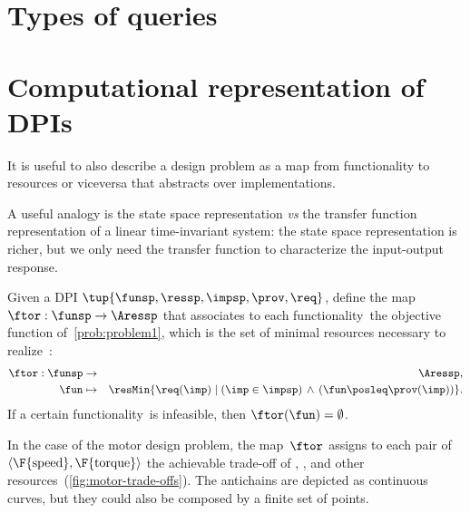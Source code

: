 

\section{Types of queries}\label{sec:solving-queries}


\section{Computational representation of DPIs}
\label{sec:solving-representation-of-dpis}

It is useful to also describe a design problem as a map from functionality to resources or viceversa that abstracts over implementations.

A useful analogy is the state space representation \emph{vs} the transfer function representation of a linear time-invariant system: the state space representation is richer, but we only need the transfer function to characterize the input-output response.


\begin{definition}
    \label{def:ftor}
    Given a DPI $\tup{ \funsp,\ressp,\impsp,\prov,\req} $,
    define the map~$\ftor:\funsp\rightarrow\Aressp$ that associates
    to each functionality~\fun the objective function of~\cref{prob:problem1},
    which is the set of minimal resources necessary to realize~\fun:
    \begin{eqnarray*}
        \ftor:\funsp & \rightarrow & \Aressp,\\
        \fun& \mapsto & \resMin\{\req(\imp)\mid\left(\imp\in\impsp\right)\,\wedge\,\left(\fun\posleq\prov(\imp)\right)\}.
    \end{eqnarray*}
    If a certain functionality~\fun is infeasible, then $\ftor(\fun)=\emptyset$.
\end{definition}



\begin{example}
    In the case of the motor design problem, the map~$\ftor$ assigns
    to each pair of $\left\langle \F{\text{speed}},\F{\text{torque}}\right\rangle $
    the achievable trade-off of , , and other resources~(\cref{fig:motor-trade-offs}).
    The antichains are depicted as continuous curves, but they could also
    be composed by a finite set of points.

\end{example}

